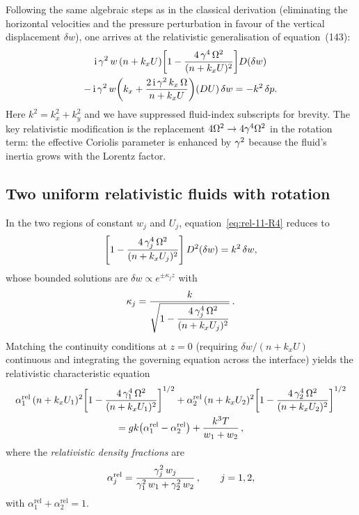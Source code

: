 Following the same algebraic steps as in the classical derivation
(eliminating the horizontal velocities and the pressure perturbation
in favour of the vertical displacement $\delta w$), one arrives at
the relativistic generalisation of equation~(143):
\begin{multline}
\label{eq:rel-11-R4}
\mathrm{i}\,\gamma^{2}\,w\,(n+k_{x}U)\!\left[
1-\frac{4\,\gamma^{4}\,\Omega^{2}}{(n+k_{x}U)^{2}}
\right]\!D(\delta w) \\
-\,\mathrm{i}\,\gamma^{2}\,w\!\left(k_{x}
+\frac{2\,\mathrm{i}\,\gamma^{2}\,k_{x}\,\Omega}{n+k_{x}U}\right)
\!(DU)\,\delta w
= -k^{2}\,\delta p.
\end{multline}
Here $k^{2}=k_{x}^{2}+k_{y}^{2}$ and we have suppressed fluid-index
subscripts for brevity.  The key relativistic modification is the
replacement $4\Omega^{2}\to 4\gamma^{4}\Omega^{2}$ in the rotation
term: the effective Coriolis parameter is enhanced by $\gamma^{2}$
because the fluid's inertia grows with the Lorentz factor.

\subsection{Two uniform relativistic fluids with rotation}
\label{sec:rel-11-105b}

In the two regions of constant $w_{j}$ and $U_{j}$,
equation~\eqref{eq:rel-11-R4} reduces to
\begin{equation}
\label{eq:rel-11-R5}
\left[1-\frac{4\,\gamma_{j}^{4}\,\Omega^{2}}{(n+k_{x}U_{j})^{2}}\right]
D^{2}(\delta w) = k^{2}\,\delta w,
\end{equation}
whose bounded solutions are $\delta w\propto e^{\pm\kappa_{j}z}$ with
\begin{equation}
\label{eq:rel-11-R6}
\kappa_{j} = \frac{k}{\sqrt{\displaystyle
1-\frac{4\,\gamma_{j}^{4}\,\Omega^{2}}{(n+k_{x}U_{j})^{2}}}}\,.
\end{equation}
Matching the continuity conditions at $z=0$ (requiring
$\delta w/(n+k_{x}U)$ continuous and integrating the governing
equation across the interface) yields the relativistic characteristic
equation
\begin{multline}
\label{eq:rel-11-R7}
\alpha_{1}^{\mathrm{rel}}\,(n+k_{x}U_{1})^{2}\!
\left[1-\frac{4\,\gamma_{1}^{4}\,\Omega^{2}}{(n+k_{x}U_{1})^{2}}
\right]^{1/2}
+\alpha_{2}^{\mathrm{rel}}\,(n+k_{x}U_{2})^{2}\!
\left[1-\frac{4\,\gamma_{2}^{4}\,\Omega^{2}}{(n+k_{x}U_{2})^{2}}
\right]^{1/2} \\
= gk\bigl(\alpha_{1}^{\mathrm{rel}}-\alpha_{2}^{\mathrm{rel}}\bigr)
+ \frac{k^{3}T}{w_{1}+w_{2}}\,,
\end{multline}
where the \emph{relativistic density fractions} are
\begin{equation}
\label{eq:rel-11-R8}
\alpha_{j}^{\mathrm{rel}}
= \frac{\gamma_{j}^{2}\,w_{j}}{\gamma_{1}^{2}\,w_{1}+\gamma_{2}^{2}\,w_{2}}\,,
\qquad j=1,2,
\end{equation}
with $\alpha_{1}^{\mathrm{rel}}+\alpha_{2}^{\mathrm{rel}}=1$.

